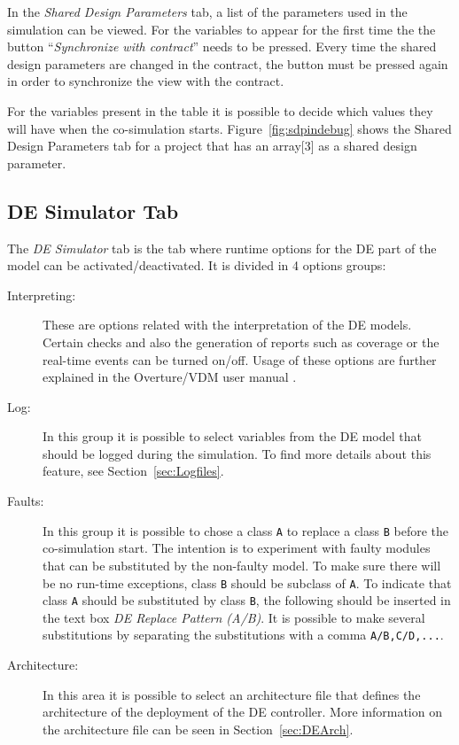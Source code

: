 \documentclass{crescendorepchap}
\begin{document}

In the \emph{Shared Design Parameters} tab, a list of the parameters used in
the simulation can be viewed. For the variables to appear for the first
time the the button ``\emph{Synchronize with contract}'' needs to be pressed.
Every time the shared design parameters are changed in the contract, the
button must be pressed again in order to synchronize the view with the
contract.

For the variables present in the table
it is possible to decide which values they will have when the
co-simulation starts. Figure~\ref{fig:sdpindebug} shows the Shared Design
Parameters tab for a project that has an array[3] as a shared design
parameter.

\subsection{DE Simulator Tab}

The \emph{DE Simulator} tab is the tab where runtime options for the DE part of
the model can be activated/deactivated. It is divided in 4 options
groups:

\begin{description}
\item[Interpreting:] These are options related with the interpretation of
  the DE models. Certain checks and also the generation of reports such
  as coverage or the real-time events can be turned on/off. Usage of these
  options are further explained in the Overture/VDM user manual \cite{Larsen&13a}.
\item[Log:] In this group it is possible to select variables from the DE
  model that should be logged during the simulation. To find more
  details about this feature, see Section~\ref{sec:Logfiles}.
\item[Faults:] In this group it is possible to
  chose a class \texttt{A} to replace a class \texttt{B} before the co-simulation start. The
  intention is to experiment with faulty modules that can be substituted
  by the non-faulty model. To make sure there will be no run-time
  exceptions, class \texttt{B} should be subclass of \texttt{A}. To indicate that class \texttt{A}
  should be substituted by class \texttt{B}, the following should be inserted in
  the text box \emph{DE Replace Pattern (A/B)}. It is possible to make several
  substitutions by separating the substitutions with a comma
  \texttt{A/B,C/D,...}.
\item[Architecture:] In this area it is
  possible to select an architecture file that defines the architecture
  of the deployment of the DE controller. More information on the
  architecture file can be seen in Section~\ref{sec:DEArch}.
\end{description}
\end{document}
